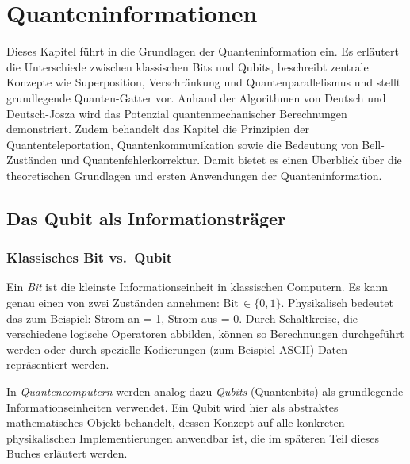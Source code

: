 \chapter{Quanteninformationen}
\label{qbits} %


\abstract{}
Dieses Kapitel führt in die Grundlagen der Quanteninformation ein. Es erläutert die Unterschiede zwischen klassischen Bits und Qubits, beschreibt zentrale Konzepte wie Superposition, Verschränkung und Quantenparallelismus und stellt grundlegende Quanten-Gatter vor. Anhand der Algorithmen von Deutsch und Deutsch-Josza wird das Potenzial quantenmechanischer Berechnungen demonstriert. Zudem behandelt das Kapitel die Prinzipien der Quantenteleportation, Quantenkommunikation sowie die Bedeutung von Bell-Zuständen und Quantenfehlerkorrektur. Damit bietet es einen Überblick über die theoretischen Grundlagen und ersten Anwendungen der Quanteninformation.

\section{Das Qubit als Informationsträger}
\label{Das Qubit als Informationsträger}
\subsection{Klassisches Bit vs.\ Qubit}
Ein \emph{Bit} ist die kleinste Informationseinheit in klassischen Computern. Es kann genau einen von zwei Zuständen annehmen: $\text{Bit}\,\in\{0,1\}$.
Physikalisch bedeutet das zum Beispiel: Strom an = 1, Strom aus = 0. Durch Schaltkreise, die verschiedene logische Operatoren abbilden, können so Berechnungen durchgeführt werden oder durch spezielle Kodierungen (zum Beispiel ASCII) Daten repräsentiert werden.

In \emph{Quantencomputern} werden analog dazu \emph{Qubits} (Quantenbits) als grundlegende Informationseinheiten verwendet. Ein Qubit wird hier als abstraktes mathematisches Objekt behandelt, dessen Konzept auf alle konkreten physikalischen Implementierungen anwendbar ist, die im späteren Teil dieses Buches erläutert werden.

